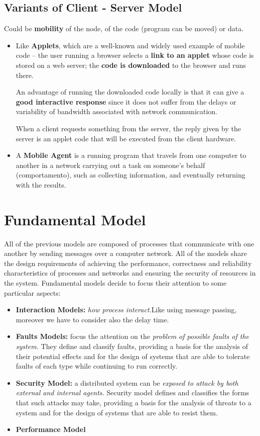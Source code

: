 \subsection{Variants of Client - Server Model}
Could be \textbf{mobility} of the node, of the code (program can be moved) or data.
\begin{itemize}
    \item Like \textbf{Applets}, which are a well-known and widely used example of mobile code – the user running a browser selects a \textbf{link to an applet} whose code is stored on a web server; the \textbf{code is downloaded} to the browser and runs there. 
    
    An advantage of running the downloaded code locally is that it can give a \textbf{good interactive response} since it does not suffer from the delays or variability of bandwidth associated with network communication.
    
    When a client requests something from the server, the reply given by the server is an applet code that will be executed from the client hardware.
    \item A \textbf{Mobile Agent} is a running program that travels from one computer to another in a network carrying out a task on someone’s behalf (comportamento), such as collecting information, and eventually returning with the results.
\end{itemize}

\section{Fundamental Model}
All of the previous models are composed of processes that communicate with one another by sending messages over a computer network. All of the models share the design requirements of achieving the performance, correctness and reliability characteristics of processes and networks and ensuring the security of resources in the system. Fundamental models decide to focus their attention to some particular aspects:
\begin{itemize}
    \item \textbf{Interaction Models:} \textit{how process interact.}Like using message passing, moreover we have to consider also the delay time.
    \item \textbf{Faults Models:} focus the attention on the \textit{problem of possible faults of the system.} They define and classify faults, providing a basis for the analysis of their potential effects and for the design of systems that are able to tolerate faults of each type while continuing to run correctly.
    \item \textbf{Security Model:} a distributed system can be \textit{exposed to attack by both external and internal agents.} Security model defines and classifies the forms that such attacks may take, providing a basis for the analysis of threats to a system and for the design of systems that are able to resist them.
    \item \textbf{Performance Model}
\end{itemize}

